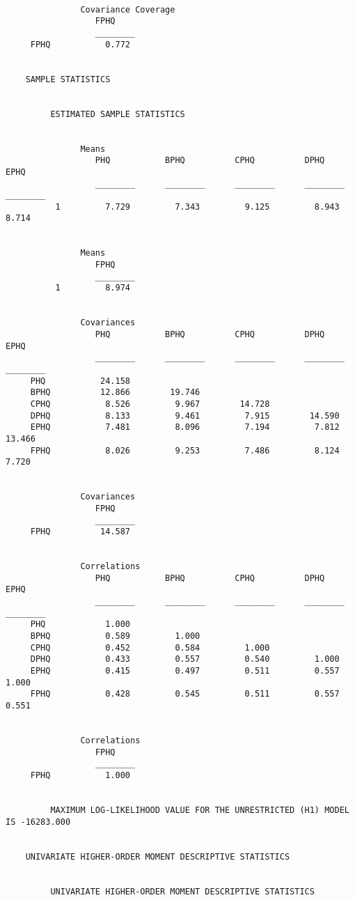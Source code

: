\documentclass[11pt]{article}
\begin{document}
\begin{verbatim}
    
               Covariance Coverage
                  FPHQ
                  ________
     FPHQ           0.772
    
    
    SAMPLE STATISTICS
    
    
         ESTIMATED SAMPLE STATISTICS
    
    
               Means
                  PHQ           BPHQ          CPHQ          DPHQ          EPHQ
                  ________      ________      ________      ________      ________
          1         7.729         7.343         9.125         8.943         8.714
    
    
               Means
                  FPHQ
                  ________
          1         8.974
    
    
               Covariances
                  PHQ           BPHQ          CPHQ          DPHQ          EPHQ
                  ________      ________      ________      ________      ________
     PHQ           24.158
     BPHQ          12.866        19.746
     CPHQ           8.526         9.967        14.728
     DPHQ           8.133         9.461         7.915        14.590
     EPHQ           7.481         8.096         7.194         7.812        13.466
     FPHQ           8.026         9.253         7.486         8.124         7.720
    
    
               Covariances
                  FPHQ
                  ________
     FPHQ          14.587
    
    
               Correlations
                  PHQ           BPHQ          CPHQ          DPHQ          EPHQ
                  ________      ________      ________      ________      ________
     PHQ            1.000
     BPHQ           0.589         1.000
     CPHQ           0.452         0.584         1.000
     DPHQ           0.433         0.557         0.540         1.000
     EPHQ           0.415         0.497         0.511         0.557         1.000
     FPHQ           0.428         0.545         0.511         0.557         0.551
    
    
               Correlations
                  FPHQ
                  ________
     FPHQ           1.000
    
    
         MAXIMUM LOG-LIKELIHOOD VALUE FOR THE UNRESTRICTED (H1) MODEL IS -16283.000
    
    
    UNIVARIATE HIGHER-ORDER MOMENT DESCRIPTIVE STATISTICS
    
    
         UNIVARIATE HIGHER-ORDER MOMENT DESCRIPTIVE STATISTICS
    

\end{verbatim}
\end{document}
